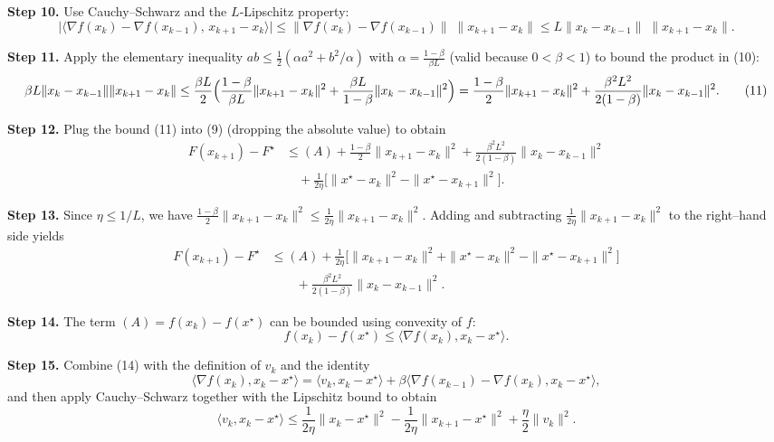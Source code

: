 \documentclass[11pt]{article}
\newcommand{\grad}{\nabla}
\begin{document}
\noindent\textbf{Step 10.} Use Cauchy–Schwarz and the $L$‑Lipschitz property:
\[
\bigl|\langle\grad f(x_k)-\grad f(x_{k-1}),\,x_{k+1}-x_k\rangle\bigr|
\le \|\grad f(x_k)-\grad f(x_{k-1})\|\;\|x_{k+1}-x_k\|
\le L\|x_k-x_{k-1}\|\;\|x_{k+1}-x_k\|.
\tag{10}
\]

\noindent\textbf{Step 11.} Apply the elementary inequality $ab\le\frac{1}{2}(\alpha a^{2}+b^{2}/\alpha)$ with $\alpha=\frac{1-\beta}{\beta L}$ (valid because $0<\beta<1$) to bound the product in (10):
\[
\beta L\|x_k-x_{k-1}\|\|x_{k+1}-x_k\|
\le \frac{\beta L}{2}\Bigl(\frac{1-\beta}{\beta L}\|x_{k+1}-x_k\|^{2}
      +\frac{\beta L}{1-\beta}\|x_k-x_{k-1}\|^{2}\Bigr)
= \frac{1-\beta}{2}\|x_{k+1}-x_k\|^{2}
  +\frac{\beta^{2}L^{2}}{2(1-\beta)}\|x_k-x_{k-1}\|^{2}.
\tag{11}
\]

\noindent\textbf{Step 12.} Plug the bound (11) into (9) (dropping the absolute value) to obtain
\[
\begin{aligned}
F(x_{k+1})-F^\star
&\le (A)
   +\frac{1-\beta}{2}\|x_{k+1}-x_k\|^{2}
   +\frac{\beta^{2}L^{2}}{2(1-\beta)}\|x_k-x_{k-1}\|^{2}\\
&\quad+\frac{1}{2\eta}\bigl[\|x^\star-x_k\|^{2}-\|x^\star-x_{k+1}\|^{2}\bigr].
\end{aligned}
\tag{12}
\]

\noindent\textbf{Step 13.} Since $\eta\le 1/L$, we have $\frac{1-\beta}{2}\|x_{k+1}-x_k\|^{2}\le\frac{1}{2\eta}\|x_{k+1}-x_k\|^{2}$. Adding and subtracting $\frac{1}{2\eta}\|x_{k+1}-x_k\|^{2}$ to the right–hand side yields
\[
\begin{aligned}
F(x_{k+1})-F^\star
&\le (A)
   +\frac{1}{2\eta}\bigl[\|x_{k+1}-x_k\|^{2}
    +\|x^\star-x_k\|^{2}-\|x^\star-x_{k+1}\|^{2}\bigr] \\
&\qquad +\frac{\beta^{2}L^{2}}{2(1-\beta)}\|x_k-x_{k-1}\|^{2}.
\end{aligned}
\tag{13}
\]

\noindent\textbf{Step 14.} The term $(A)=f(x_k)-f(x^\star)$ can be bounded using convexity of $f$:
\[
f(x_k)-f(x^\star)\le\langle\grad f(x_k),x_k-x^\star\rangle.
\tag{14}
\]

\noindent\textbf{Step 15.} Combine (14) with the definition of $v_k$ and the identity
\[
\langle\grad f(x_k),x_k-x^\star\rangle
= \langle v_k,x_k-x^\star\rangle
   +\beta\langle\grad f(x_{k-1})-\grad f(x_k),x_k-x^\star\rangle,
\]
and then apply Cauchy–Schwarz together with the Lipschitz bound to obtain
\[
\langle v_k,x_k-x^\star\rangle
\le \frac{1}{2\eta}\|x_k-x^\star\|^{2}
    -\frac{1}{2\eta}\|x_{k+1}-x^\star\|^{2}
    +\frac{\eta}{2}\|v_k\|^{2}.
\tag{15}
\]
\end{document}
